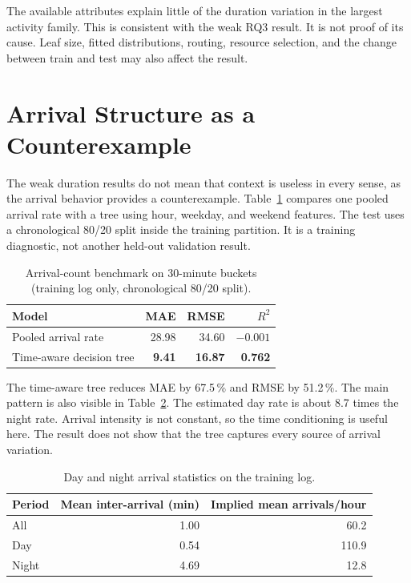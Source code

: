 The available attributes explain little of the duration variation in the
largest activity family. This is consistent with the weak RQ3 result. It is
not proof of its cause. Leaf size, fitted distributions, routing, resource
selection, and the change between train and test may also affect the result.

\section{Arrival Structure as a Counterexample}
\label{sec:results_arrival_process}

The weak duration results do not mean that context is useless in every sense, as
the arrival behavior provides a counterexample. Table~\ref{tab:arrival_benchmark} compares
one pooled arrival rate with a tree using hour, weekday, and weekend features.
The test uses a chronological 80/20 split inside the training partition. It is
a training diagnostic, not another held-out validation result.

\begin{table}[htbp]
\centering
\begin{tabular}{lrrr}
\toprule
\textbf{Model} & \textbf{MAE} & \textbf{RMSE} & \textbf{$R^{2}$} \\
\midrule
Pooled arrival rate      & 28.98 & 34.60 & $-0.001$ \\
Time-aware decision tree & \textbf{9.41} & \textbf{16.87} & \textbf{0.762} \\
\bottomrule
\end{tabular}
\caption{Arrival-count benchmark on 30-minute buckets (training log only,
chronological 80/20 split).}
\label{tab:arrival_benchmark}
\end{table}

The time-aware tree reduces MAE by 67.5\,\% and RMSE by 51.2\,\%. The main
pattern is also visible in Table~\ref{tab:day_night}. The estimated day rate is
about 8.7 times the night rate. Arrival intensity is not constant, so the time conditioning is useful here. The result does not show that the tree
captures every source of arrival variation.

\begin{table}[htbp]
\centering
\begin{tabular}{lrr}
\toprule
\textbf{Period} & \textbf{Mean inter-arrival (min)} &
\textbf{Implied mean arrivals/hour} \\
\midrule
All   & 1.00 & 60.2 \\
Day   & 0.54 & 110.9 \\
Night & 4.69 & 12.8 \\
\bottomrule
\end{tabular}
\caption{Day and night arrival statistics on the training log.}
\label{tab:day_night}
\end{table}

